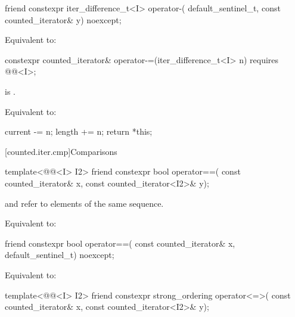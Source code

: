 %
\begin{itemdecl}
friend constexpr iter_difference_t<I> operator-(
  default_sentinel_t, const counted_iterator& y) noexcept;
\end{itemdecl}

\begin{itemdescr}
\pnum
\effects
Equivalent to: 
\end{itemdescr}

%
\begin{itemdecl}
constexpr counted_iterator& operator-=(iter_difference_t<I> n)
  requires @@<I>;
\end{itemdecl}

\begin{itemdescr}
\pnum
\hardexpects
{} is .

\pnum
\effects
Equivalent to:
\begin{codeblock}
current -= n;
length += n;
return *this;
\end{codeblock}
\end{itemdescr}

[counted.iter.cmp]{Comparisons}

%
\begin{itemdecl}
template<@@<I> I2>
  friend constexpr bool operator==(
    const counted_iterator& x, const counted_iterator<I2>& y);
\end{itemdecl}

\begin{itemdescr}
\pnum
\expects
{} and  refer to
elements of the same sequence.

\pnum
\effects
Equivalent to: 
\end{itemdescr}

%
\begin{itemdecl}
friend constexpr bool operator==(
  const counted_iterator& x, default_sentinel_t) noexcept;
\end{itemdecl}

\begin{itemdescr}
\pnum
\effects
Equivalent to: 
\end{itemdescr}

%
\begin{itemdecl}
template<@@<I> I2>
  friend constexpr strong_ordering operator<=>(
    const counted_iterator& x, const counted_iterator<I2>& y);
\end{itemdecl}

